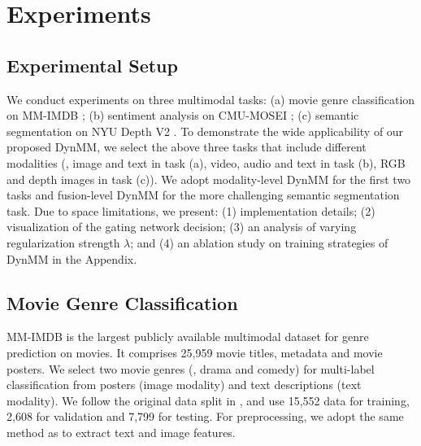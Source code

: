 \section{Experiments} \label{sec.exp}

\subsection{Experimental Setup}
We conduct experiments on three multimodal tasks: (a) movie genre classification on MM-IMDB \cite{imdb}; (b) sentiment analysis on CMU-MOSEI \cite{mosei}; (c) semantic segmentation on NYU Depth V2 \cite{nyu}. To demonstrate the wide applicability of our proposed DynMM, we select the above three tasks that include different modalities (\ie, image and text in task (a), video, audio and text in task (b), RGB and depth images in task (c)). We adopt modality-level DynMM for the first two tasks and fusion-level DynMM for the more challenging semantic segmentation task. Due to space limitations, we present: (1) implementation details; (2) visualization of the gating network decision; (3) an analysis of varying regularization strength $\lambda$; and (4) an ablation study on training strategies of DynMM in the Appendix.

\subsection{Movie Genre Classification}
MM-IMDB is the largest publicly available multimodal dataset for genre prediction on movies. It comprises 25,959 movie titles, metadata and movie posters. We select two movie genres (\ie, drama and comedy) for multi-label
classification from posters (image modality) and text descriptions (text modality). We follow the original data split in \cite{imdb}, and use 15,552 data for training, 2,608 for validation and 7,799 for testing. For preprocessing, we adopt the same method as \cite{imdb,multibench} to extract text and image features.



